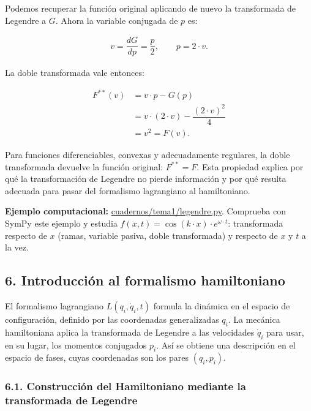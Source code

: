 \documentclass[
  spanish,
]{article}
\begin{document}
Podemos recuperar la función original aplicando de nuevo la transformada
de Legendre a \(G\). Ahora la variable conjugada de \(p\) es:

\[
\begin{aligned}
v = \dfrac{dG}{dp} = \dfrac{p}{2},
\qquad
p=2 \cdot v.
\end{aligned}
\]

La doble transformada vale entonces:

\[
\begin{aligned}
F^{**}(v)
&= v \cdot p-G(p) \\
&= v \cdot (2 \cdot v)-\dfrac{(2 \cdot v)^2}{4} \\
&= v^2 = F(v).
\end{aligned}
\]

Para funciones diferenciables, convexas y adecuadamente regulares, la
doble transformada devuelve la función original: \(F^{**}=F\). Esta
propiedad explica por qué la transformación de Legendre no pierde
información y por qué resulta adecuada para pasar del formalismo
lagrangiano al hamiltoniano.

\textbf{Ejemplo computacional:}
\href{https://github.com/julian1c2a/MCC/blob/main/cuadernos/tema1/legendre.py}{cuadernos/tema1/legendre.py}.
Comprueba con SymPy este ejemplo y estudia
\(f(x,t) = \cos(k \cdot x) \cdot e^{\omega \cdot t}\): transformada
respecto de \(x\) (ramas, variable pasiva, doble transformada) y
respecto de \(x\) y \(t\) a la vez.

\subsection{6. Introducción al formalismo
hamiltoniano}\label{introducciuxf3n-al-formalismo-hamiltoniano}

El formalismo lagrangiano \(L(q_i, \dot{q}_i, t)\) formula la dinámica
en el espacio de configuración, definido por las coordenadas
generalizadas \(q_i\). La mecánica hamiltoniana aplica la transformada
de Legendre a las velocidades \(\dot{q}_i\) para usar, en su lugar, los
momentos conjugados \(p_i\). Así se obtiene una descripción en el
espacio de fases, cuyas coordenadas son los pares \((q_i,p_i)\).

\subsubsection{6.1. Construcción del Hamiltoniano mediante la
transformada de
Legendre}\label{construcciuxf3n-del-hamiltoniano-mediante-la-transformada-de-legendre}
\end{document}
